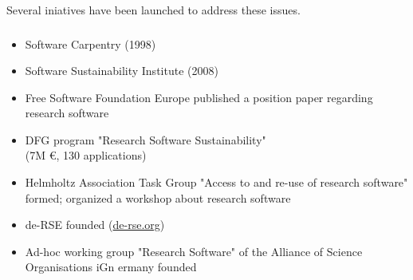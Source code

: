 \documentclass{beamer}
\begin{document}
\begin{frame}
  \begin{block}{}
    \begin{center}
      Several iniatives have been launched to address these issues.
    \end{center}
  \end{block}
\end{frame}


\begin{frame}
  \frametitle{}
  \begin{block}{}
    {\normalsize
      \begin{itemize}
      \item Software Carpentry (1998)\pause
      \item Software Sustainability Institute (2008)\pause
      \item Free Software Foundation Europe published a position paper
        regarding research software

        
      \item DFG program "Research Software Sustainability"\\
        (7M €, 130 applications)\pause
      \item Helmholtz Association Task Group "Access to and re-use of
        research software" formed; organized a workshop about
        research software\pause
      \item de-RSE founded (\href{http://de-rse.org}{de-rse.org})\pause
      \item Ad-hoc working group "Research Software" of the Alliance of
        Science Organisations iGn ermany founded
    \end{itemize}
    }
  \end{block}
\end{frame}
\end{document}
